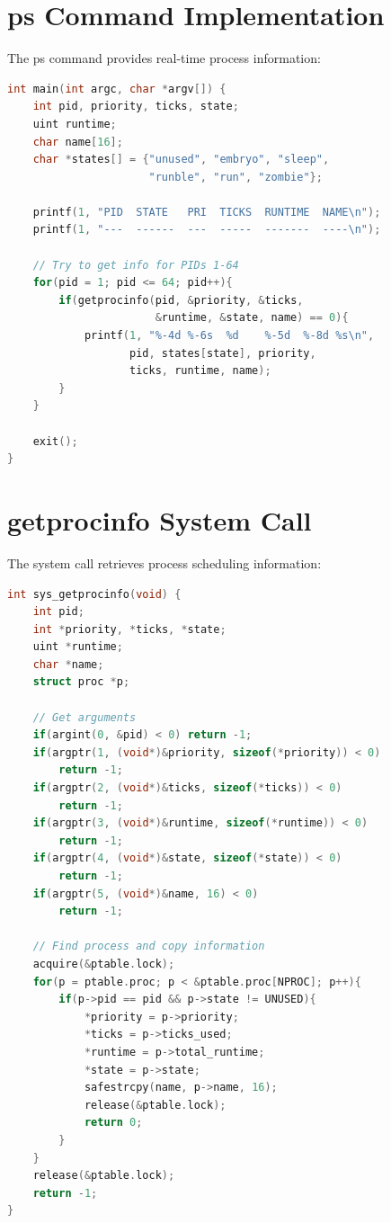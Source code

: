 \documentclass[a4paper,12pt]{report}
\begin{document}
\section{ps Command Implementation}

The ps command provides real-time process information:

\begin{lstlisting}[language=C, caption=PS Command (ps.c)]
int main(int argc, char *argv[]) {
    int pid, priority, ticks, state;
    uint runtime;
    char name[16];
    char *states[] = {"unused", "embryo", "sleep", 
                      "runble", "run", "zombie"};
    
    printf(1, "PID  STATE   PRI  TICKS  RUNTIME  NAME\n");
    printf(1, "---  ------  ---  -----  -------  ----\n");
    
    // Try to get info for PIDs 1-64
    for(pid = 1; pid <= 64; pid++){
        if(getprocinfo(pid, &priority, &ticks, 
                       &runtime, &state, name) == 0){
            printf(1, "%-4d %-6s  %d    %-5d  %-8d %s\n", 
                   pid, states[state], priority, 
                   ticks, runtime, name);
        }
    }
    
    exit();
}
\end{lstlisting}

\section{getprocinfo System Call}

The system call retrieves process scheduling information:

\begin{lstlisting}[language=C, caption=getprocinfo System Call (sysproc.c)]
int sys_getprocinfo(void) {
    int pid;
    int *priority, *ticks, *state;
    uint *runtime;
    char *name;
    struct proc *p;
    
    // Get arguments
    if(argint(0, &pid) < 0) return -1;
    if(argptr(1, (void*)&priority, sizeof(*priority)) < 0) 
        return -1;
    if(argptr(2, (void*)&ticks, sizeof(*ticks)) < 0) 
        return -1;
    if(argptr(3, (void*)&runtime, sizeof(*runtime)) < 0) 
        return -1;
    if(argptr(4, (void*)&state, sizeof(*state)) < 0) 
        return -1;
    if(argptr(5, (void*)&name, 16) < 0) 
        return -1;
    
    // Find process and copy information
    acquire(&ptable.lock);
    for(p = ptable.proc; p < &ptable.proc[NPROC]; p++){
        if(p->pid == pid && p->state != UNUSED){
            *priority = p->priority;
            *ticks = p->ticks_used;
            *runtime = p->total_runtime;
            *state = p->state;
            safestrcpy(name, p->name, 16);
            release(&ptable.lock);
            return 0;
        }
    }
    release(&ptable.lock);
    return -1;
}
\end{lstlisting}
\end{document}
